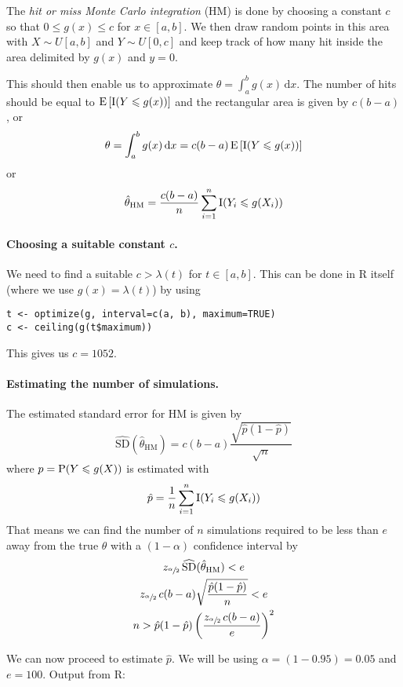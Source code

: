 \documentclass[a4paper,english,12pt]{article}
\begin{document}
The \textit{hit or miss Monte Carlo integration} (HM) is done by choosing a
constant $c$ so that $0 \leqslant g(x) \leqslant c$ for $x \in [a,b]$. We then
draw random points in this area with $X \sim U[a, b]$ and $Y \sim U[0, c]$ and
keep track of how many hit inside the area delimited by
$g(x)$ and $y=0$.

This should then enable us to approximate $\theta = \int_a^b
g(x)\, \textrm{d}x$. The number of hits should be equal to
$\mathrm{E}\left[ \mathrm{I}(Y \leqslant g(x)) \right]$ and the rectangular area is given by
$c(b-a)$, or
\[
  \theta = \int_a^b g(x)\, \textrm{d}x
    = c(b-a)\, \mathrm{E}\left[ \mathrm{I}(Y \leqslant g(x)) \right]
\]
or
\[
  \hat{\theta}_{\textrm{HM}} =
    \frac{c(b-a)}{n} \sum_{i=1}^n \mathrm{I}(Y_i \leqslant g(X_i))
\]

\paragraph{Choosing a suitable constant $c$.}
We need to find a suitable $c > \lambda(t)$ for $t \in [a, b]$. This can be
done in R itself (where we use $g(x) = \lambda(t)$) by using
\begin{Verbatim}
t <- optimize(g, interval=c(a, b), maximum=TRUE)
c <- ceiling(g(t$maximum))
\end{Verbatim}
This gives us $c = 1052$.

\paragraph{Estimating the number of simulations.}
The estimated standard error for HM is given by
\[
  \widehat{\textrm{SD}}(\hat{\theta}_{\textrm{HM}})
    = c(b-a) \frac{ \sqrt{\hat{p}(1-\hat{p})}  }{\sqrt{n}}
\]
where $p = \mathrm{P}(Y \leqslant g(X))$ is estimated with
\[
  \hat{p} = \frac{1}{n} \sum_{i=1}^{n} \mathrm{I}( Y_i \leqslant g(X_i) )
\]
That means we can find the number of $n$ simulations required to be less than
$e$ away from the true $\theta$ with a $(1-\alpha)$ confidence interval by
\begin{gather*}
  z_{\sfrac{\alpha}{2}}\, \widehat{\textrm{SD}}(\hat{\theta}_{\textrm{HM}}) < e \\
  z_{\sfrac{\alpha}{2}}\, c(b-a) \sqrt{ \frac{\hat{p}(1-\hat{p})}{n} } < e \\
  n > \hat{p} (1 - \hat{p})
          \left( \frac{ z_{\sfrac{\alpha}{2}}\, c(b - a) }{ e } \right)^2
\end{gather*}

We can now proceed to estimate $\hat{p}$. We will be using $\alpha = (1-0.95) =
0.05$ and $e = 100$. Output from R:
\end{document}
